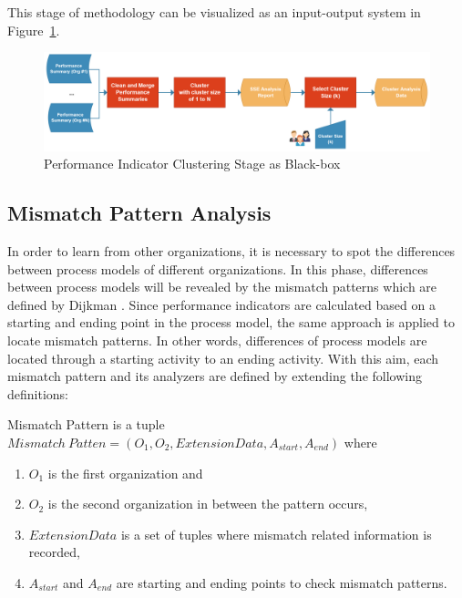 This stage of methodology can be visualized as an input-output system in Figure~\ref{fig:performance-indicator-clustering-blackbox}. 
\begin{figure}
  \centering
  \includegraphics[width=\textwidth]{4_methodology/performance-indicator-clustering-blackbox}
  \caption{Performance Indicator Clustering Stage as Black-box }
  \label{fig:performance-indicator-clustering-blackbox}
\end{figure}

\subsection{Mismatch Pattern Analysis}
\label{subsec:mismatch-pattern-analysis}
In order to learn from other organizations, it is necessary to spot the differences between process models of different organizations. In this phase, differences between process models will be revealed by the mismatch patterns which are defined by Dijkman \cite{dijkman2007mismatch}. Since performance indicators are calculated based on a starting and ending point in the process model, the same approach is applied to locate mismatch patterns. In other words, differences of process models are located through a starting activity to an ending activity. With this aim, each mismatch pattern and its analyzers are defined by extending the following definitions:
\theoremstyle{definition}
    \begin{definition}
    Mismatch Pattern is a tuple ${Mismatch\ Patten} = (O_{1}, O_{2}, ExtensionData, A_{start}, A_{end}) $ where 
    \begin{enumerate}
      \item $O_{1}$ is the first organization and \item $O_{2}$ is the second organization in between the pattern occurs,
      \item $ExtensionData$ is a set of tuples where mismatch related information is recorded, 
      \item $A_{start}$ and $A_{end}$ are starting and ending points to check mismatch patterns.
    \end{enumerate}
    \end{definition}
\theoremstyle{definition}

